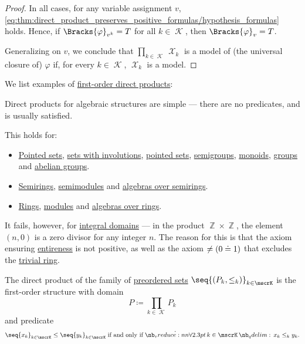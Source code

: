 \begin{proof}
  In all cases, for any variable assignment \( v \), \eqref{eq:thm:direct_product_preserves_positive_formulas/hypothesis_formulas} holds. Hence, if \( \Bracks{\varphi}_{v^k} = T \) for all \( k \in \mscrK \), then \( \Bracks{\varphi}_v = T \).

  Generalizing on \( v \), we conclude that \( \prod_{k \in \mscrK} \mscrX_k \) is a model of (the universal closure of) \( \varphi \) if, for every \( k \in \mscrK \), \( \mscrX_k \) is a model.
\end{proof}

\begin{example}\label{ex:def:first_order_direct_product}
  We list examples of \hyperref[def:first_order_direct_product]{first-order direct products}:
  \begin{thmenum}
     Direct products for algebraic structures are simple --- there are no predicates, and  is usually satisfied.

    This holds for:
    \begin{itemize}
      \item \hyperref[def:pointed_set]{Pointed sets}, \hyperref[def:set_with_involution]{sets with involutions}, \hyperref[def:pointed_set]{pointed sets}, \hyperref[def:semigroup]{semigroups}, \hyperref[def:monoid]{monoids}, \hyperref[def:group]{groups} and \hyperref[def:abelian_group]{abelian groups}.

      \item \hyperref[def:semiring]{Semirings}, \hyperref[def:semimodule]{semimodules} and \hyperref[def:algebra_over_semiring]{algebras over semirings}.

      \item \hyperref[def:ring]{Rings}, \hyperref[def:module]{modules} and \hyperref[def:algebra_over_ring]{algebras over rings}.
    \end{itemize}

    It fails, however, for \hyperref[def:integral_domain]{integral domains} --- in the product \( \BbbZ \times \BbbZ \), the element \( (n, 0) \) is a zero divisor for any integer \( n \). The reason for this is that the axiom ensuring \hyperref[def:entire_semiring]{entireness} is not positive, as well as the axiom \( \neq (0 \doteq 1) \) that excludes the \hyperref[def:ring/trivial]{trivial ring}.

     The direct product of the family of \hyperref[def:preordered_set]{preordered sets} \( \seq{ (P_k, \leq_k) }_{k \in \mscrK} \) is the first-order structure with domain
    \begin{equation*}
      P \coloneqq \prod_{k \in \mscrK} P_k
    \end{equation*}
    and predicate
    \begin{equation*}
      \seq{ x_k }_{k \in \mscrK} \leq \seq{ y_k }_{k \in \mscrK} \T{if and only if} \qforall{k \in \mscrK} x_k \leq_k y_k.
    \end{equation*}


\end{thmenum}
\end{example}
